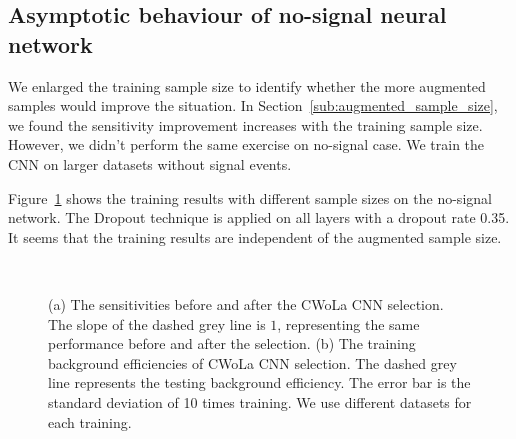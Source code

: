 \documentclass[12pt]{article}
\begin{document}
    \subsection{Asymptotic behaviour of no-signal neural network}%
    \label{sub:asymptotic_behaviour_of_no_signal_neural_network}
        We enlarged the training sample size to identify whether the more augmented samples would improve the situation. In Section~\ref{sub:augmented_sample_size}, we found the sensitivity improvement increases with the training sample size. However, we didn't perform the same exercise on no-signal case. We train the CNN on larger datasets without signal events.
        
        Figure~\ref{fig:sensitivity_improvement_background_pass_rate_aug_3_to_10} shows the training results with different sample sizes on the no-signal network. The Dropout technique is applied on all layers with a dropout rate 0.35. It seems that the training results are independent of the augmented sample size.
        \begin{figure}[htpb]
            \centering
             \\
            \caption{(a) The sensitivities before and after the CWoLa CNN selection. The slope of the dashed grey line is $1$, representing the same performance before and after the selection. (b) The training background efficiencies of CWoLa CNN selection. The dashed grey line represents the testing background efficiency. The error bar is the standard deviation of 10 times training. We use different datasets for each training.}
            \label{fig:sensitivity_improvement_background_pass_rate_aug_3_to_10}
        \end{figure}
\end{document}
